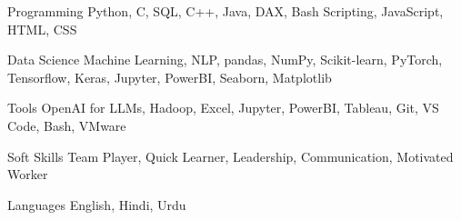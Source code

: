 

\begin{cvskills}
	
	\cvskill
	{Programming} %
	{Python, C,  SQL, C++, Java, DAX, Bash Scripting, JavaScript, HTML, CSS} %
	
	\cvskill
	{Data Science} %
	{Machine Learning,  NLP, pandas, NumPy, Scikit-learn,  PyTorch, Tensorflow, Keras, Jupyter, PowerBI, Seaborn, Matplotlib } %
	
	\cvskill
	{Tools} %
	{OpenAI for LLMs, Hadoop, Excel, Jupyter, PowerBI, Tableau, Git, VS Code, Bash, VMware} %
	
	\cvskill
	{Soft Skills} %
	{Team Player, Quick Learner, Leadership, Communication, Motivated Worker} %
	
	\cvskill
	{Languages} %
	{English, Hindi, Urdu} %
	
\end{cvskills}
